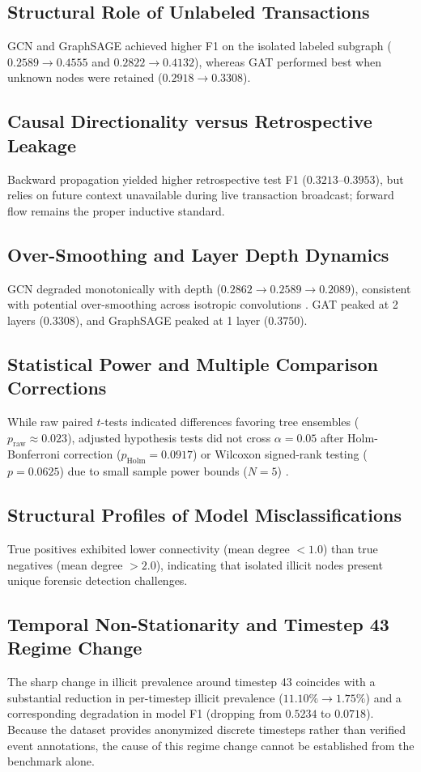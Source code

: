\documentclass[conference]{IEEEtran}
\begin{document}
\subsection{Structural Role of Unlabeled Transactions}
GCN and GraphSAGE achieved higher F1 on the isolated labeled subgraph ($0.2589 \to 0.4555$ and $0.2822 \to 0.4132$), whereas GAT performed best when unknown nodes were retained ($0.2918 \to 0.3308$).

\subsection{Causal Directionality versus Retrospective Leakage}
Backward propagation yielded higher retrospective test F1 ($0.3213$--$0.3953$), but relies on future context unavailable during live transaction broadcast; forward flow remains the proper inductive standard.

\subsection{Over-Smoothing and Layer Depth Dynamics}
GCN degraded monotonically with depth ($0.2862 \to 0.2589 \to 0.2089$), consistent with potential over-smoothing across isotropic convolutions \cite{li2018deeper, oono2020graph, chen2020measuring}. GAT peaked at 2 layers ($0.3308$), and GraphSAGE peaked at 1 layer ($0.3750$).

\subsection{Statistical Power and Multiple Comparison Corrections}
While raw paired $t$-tests indicated differences favoring tree ensembles ($p_{\text{raw}} \approx 0.023$), adjusted hypothesis tests did not cross $\alpha = 0.05$ after Holm-Bonferroni correction ($p_{\text{Holm}} = 0.0917$) or Wilcoxon signed-rank testing ($p = 0.0625$) due to small sample power bounds ($N=5$) \cite{wilcoxon1945individual, holm1979simple, demsar2006statistical}.

\subsection{Structural Profiles of Model Misclassifications}
True positives exhibited lower connectivity (mean degree $< 1.0$) than true negatives (mean degree $> 2.0$), indicating that isolated illicit nodes present unique forensic detection challenges.

\subsection{Temporal Non-Stationarity and Timestep 43 Regime Change}
The sharp change in illicit prevalence around timestep 43 coincides with a substantial reduction in per-timestep illicit prevalence ($11.10\% \to 1.75\%$) and a corresponding degradation in model F1 (dropping from $0.5234$ to $0.0718$). Because the dataset provides anonymized discrete timesteps rather than verified event annotations, the cause of this regime change cannot be established from the benchmark alone.
\end{document}
